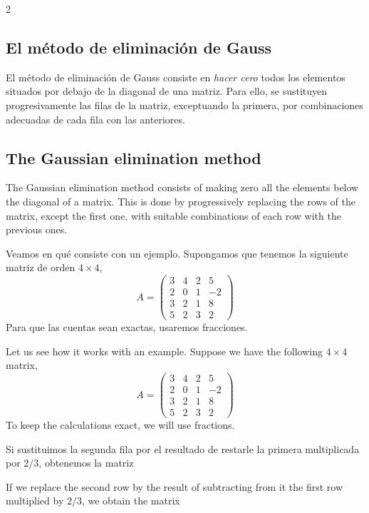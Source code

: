 \begin{paracol}{2}
\subsection{El método de eliminación de Gauss} El método de eliminación de Gauss consiste en \emph{hacer cero} todos los elementos situados por debajo de la diagonal de una matriz. Para ello, se sustituyen progresivamente las filas de la matriz, exceptuando la primera, por combinaciones adecuadas de cada fila con las anteriores.

\switchcolumn
\subsection{The Gaussian elimination method}  The Gaussian elimination method consists of making zero all the elements below the diagonal of a matrix. This is done by progressively replacing the rows of the matrix, except the first one, with suitable combinations of each row with the previous ones.

\switchcolumn
Veamos en qué consiste con un ejemplo. Supongamos que tenemos la siguiente matriz de orden $4 \times 4$,
\begin{equation*}
A=\begin{pmatrix}
3& 4& 2&5\\
2& 0& 1& -2\\
3& 2& 1& 8\\
5& 2& 3& 2
\end{pmatrix}
\end{equation*}
Para que las cuentas sean exactas, usaremos fracciones.

\switchcolumn
Let us see how it works with an example. Suppose we have the following $4 \times 4$ matrix,
\begin{equation*}
A=\begin{pmatrix}
3& 4& 2&5\\
2& 0& 1& -2\\
3& 2& 1& 8\\
5& 2& 3& 2
\end{pmatrix}
\end{equation*}
To keep the calculations exact, we will use fractions.

\switchcolumn

Si sustituimos la segunda fila por el resultado de restarle la primera multiplicada por $2/3$, obtenemos la matriz

\switchcolumn

If we replace the second row by the result of subtracting from it the first row multiplied by $2/3$, we obtain the matrix

\end{paracol}

